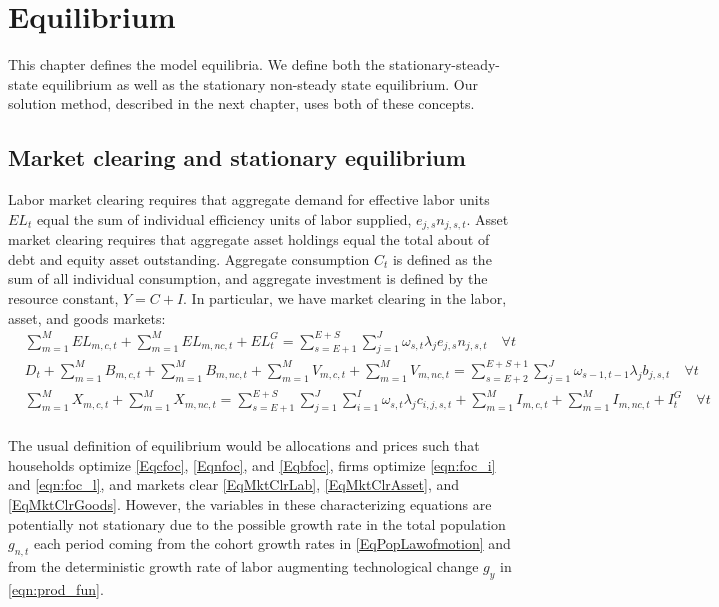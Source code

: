 \chapter{Equilibrium}
%



This chapter defines the model equilibria.  We define both the stationary-steady-state equilibrium as well as the stationary non-steady state equilibrium.  Our solution method, described in the next chapter, uses both of these concepts.

 \section{Market clearing and stationary equilibrium}\label{SecMCEqlbm}

    Labor market clearing requires that aggregate demand for effective labor units $EL_t$  equal the sum of individual efficiency units of labor supplied, $e_{j,s}n_{j,s,t}$. Asset market clearing requires that aggregate asset holdings equal the total about of debt and equity asset outstanding. Aggregate consumption $C_t$ is defined as the sum of all individual consumption, and aggregate investment is defined by the resource constant, $Y = C + I$. In particular, we have market clearing in the labor, asset, and goods markets: 
    \begin{align}
     & \sum_{m=1}^{M} EL_{m,c,t} +  \sum_{m=1}^{M} EL_{m,nc,t} + EL^{G}_{t} = \sum_{s=E+1}^{E+S}\sum_{j=1}^{J} \omega_{s,t}\lambda_j e_{j,s}n_{j,s,t} \quad \forall t \label{EqMktClrLab} \\
      & D_{t} +  \sum_{m=1}^{M} B_{m,c,t} +  \sum_{m=1}^{M} B_{m,nc,t} + \sum_{m=1}^{M} V_{m,c,t} +  \sum_{m=1}^{M} V_{m,nc,t}  = \sum_{s=E+2}^{E+S+1}\sum_{j=1}^{J}\omega_{s-1,t-1}\lambda_j b_{j,s,t}  \quad \forall t \label{EqMktClrAsset} \\
   &   \sum_{m=1}^{M} X_{m,c,t} +  \sum_{m=1}^{M} X_{m,nc,t}   = \sum_{s=E+1}^{E+S}\sum_{j=1}^{J}\sum_{i=1}^{I}\omega_{s,t}\lambda_j c_{i,j,s,t} + \sum_{m=1}^{M} I_{m,c,t} +  \sum_{m=1}^{M} I_{m,nc,t} + I^{G}_{t}  \quad\forall t \\
 \label{EqMktClrGoods}
    \end{align}

    The usual definition of equilibrium would be allocations and prices such that households optimize \eqref{Eqcfoc}, \eqref{Eqnfoc}, and \eqref{Eqbfoc}, firms optimize \eqref{eqn:foc_i} and \eqref{eqn:foc_l}, and markets clear \eqref{EqMktClrLab}, \eqref{EqMktClrAsset}, and \eqref{EqMktClrGoods}. However, the variables in these characterizing equations are potentially not stationary due to the possible growth rate in the total population $g_{n,t}$ each period coming from the cohort growth rates in \eqref{EqPopLawofmotion} and from the deterministic growth rate of labor augmenting technological change $g_y$ in \eqref{eqn:prod_fun}.

